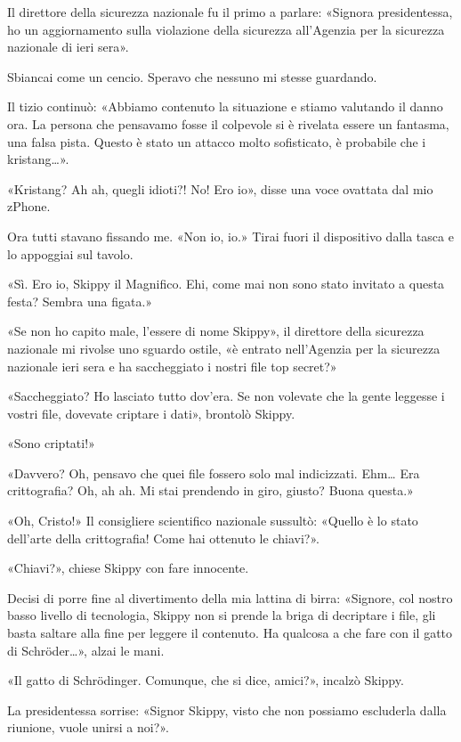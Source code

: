 Il direttore della sicurezza nazionale fu il primo a parlare: «Signora
presidentessa, ho un aggiornamento sulla violazione della sicurezza
all'Agenzia per la sicurezza nazionale di ieri sera».

Sbiancai come un cencio. Speravo che nessuno mi stesse guardando.

Il tizio continuò: «Abbiamo contenuto la situazione e stiamo valutando
il danno ora. La persona che pensavamo fosse il colpevole si è rivelata
essere un fantasma, una falsa pista. Questo è stato un attacco molto
sofisticato, è probabile che i kristang\ldots».

«Kristang? Ah ah, quegli idioti?! No! Ero io», disse una voce ovattata
dal mio zPhone.

Ora tutti stavano fissando me. «Non io, io.» Tirai fuori il dispositivo
dalla tasca e lo appoggiai sul tavolo.

«Sì. Ero io, Skippy il Magnifico. Ehi, come mai non sono stato invitato
a questa festa? Sembra una figata.»

«Se non ho capito male, l'essere di nome Skippy», il direttore della
sicurezza nazionale mi rivolse uno sguardo ostile, «è entrato
nell'Agenzia per la sicurezza nazionale ieri sera e ha saccheggiato i
nostri file top secret?»

«Saccheggiato? Ho lasciato tutto dov'era. Se non volevate che la gente
leggesse i vostri file, dovevate criptare i dati», brontolò Skippy.

«Sono criptati!»

«Davvero? Oh, pensavo che quei file fossero solo mal indicizzati.
Ehm\ldots{} Era crittografia? Oh, ah ah. Mi stai prendendo in giro,
giusto? Buona questa.»

«Oh, Cristo!» Il consigliere scientifico nazionale sussultò: «Quello è
lo stato dell'arte della crittografia! Come hai ottenuto le chiavi?».

«Chiavi?», chiese Skippy con fare innocente.

Decisi di porre fine al divertimento della mia lattina di birra:
«Signore, col nostro basso livello di tecnologia, Skippy non si prende
la briga di decriptare i file, gli basta saltare alla fine per leggere
il contenuto. Ha qualcosa a che fare con il gatto di Schröder\ldots»,
alzai le mani.

«Il gatto di Schrödinger. Comunque, che si dice, amici?», incalzò
Skippy.

La presidentessa sorrise: «Signor Skippy, visto che non possiamo
escluderla dalla riunione, vuole unirsi a noi?».

